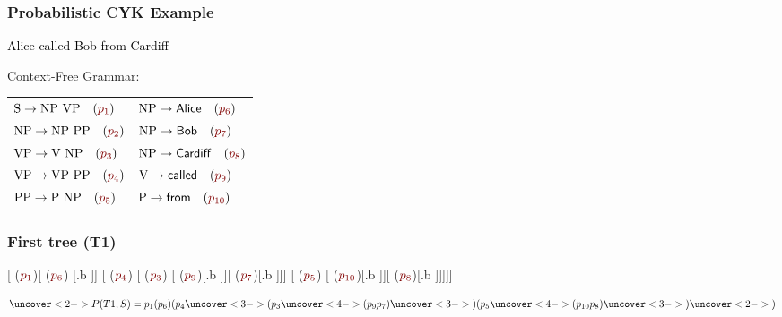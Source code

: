 \begin{frame}
  \frametitle{Probabilistic CYK Example}
  \textcolor{black}{Alice called Bob from Cardiff}

  \bigskip
  Context-Free Grammar:

  \bigskip
  \begin{center}
  \begin{tabular}{p{10em}p{10em}}
    $\mbox{S} \rightarrow \mbox{NP VP} \quad (\prob{1})$ 
    & $\mbox{NP} \rightarrow \mbox{\terminal{Alice}} \quad (\prob{6})$  \\
    $\mbox{NP} \rightarrow \mbox{NP PP} \quad (\prob{2})$ 
    & $\mbox{NP} \rightarrow \mbox{\terminal{Bob}} \quad (\prob{7})$ \\
    $\mbox{VP} \rightarrow \mbox{V NP} \quad (\prob{3})$ 
    & $\mbox{NP} \rightarrow \mbox{\terminal{Cardiff}} \quad (\prob{8})$ \\
    $\mbox{VP} \rightarrow \mbox{VP PP} \quad (\prob{4})$ 
    & $\mbox{V} \rightarrow \mbox{\terminal{called}} \quad (\prob{9})$ \\
    $\mbox{PP} \rightarrow \mbox{P NP} \quad (\prob{5})$ 
    & $\mbox{P} \rightarrow \mbox{\terminal{from}} \quad (\prob{10})$ \\    
  \end{tabular}
  \end{center}
\end{frame}

\begin{frame}
  \frametitle{First tree (T1)}
  \begin{center}
    [ ($\prob{1}$)[ ($\prob{6}$) [.b ]]
                         [ ($\prob{4}$) 
                             [ ($\prob{3}$)
                                    [ ($\prob{9}$)[.b ]][ ($\prob{7}$)[.b ]]]
                             [ ($\prob{5}$)
                                    [ ($\prob{10}$)[.b ]][ ($\prob{8}$)[.b ]]]]]

  \end{center}

  \[ \uncover<2->{ P(T1, S) = p_1 (p_6)( p_4  } 
     \uncover<3->{ (p_3 } 
     \uncover<4->{ (p_9 p_7) }
     \uncover<3->{ )(p_5 }
     \uncover<4->{ (p_{10} p_8) }
     \uncover<3->{ ) } 
     \uncover<2->{ ) }
  \]
\end{frame}

